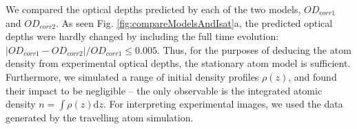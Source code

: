 \documentclass[12pt]{iopart}
\begin{document}
\par We compared the optical depths predicted by each of the two models, $OD_{corr1}$ and $OD_{corr2}$. As seen Fig. \ref{fig:compareModelsAndIsat}a, the predicted optical depths were hardly changed by including the full time evolution:  $\left|OD_{corr1}-OD_{corr2}\right|/OD_{corr1} \le 0.005$. Thus, for the purposes of deducing the atom density from experimental optical depths, the stationary atom model is sufficient. Furthermore, we simulated a range of initial density profiles $\rho(z)$, and found their impact to be negligible \--- the only observable is the integrated atomic density $n=\int\rho(z)\mathrm{d}z$. For interpreting experimental images, we used the data generated by the travelling atom simulation.
\begin{figure}

\end{figure}
\end{document}
